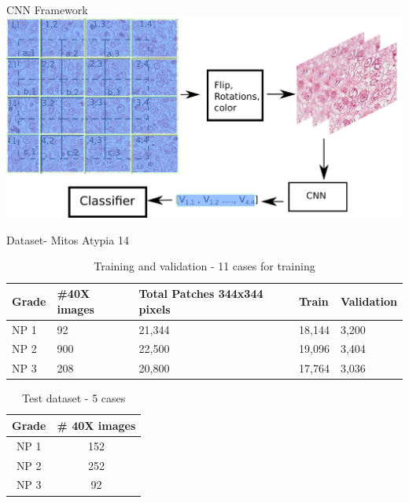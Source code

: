 \documentclass[usenames,dvipsnames]{beamer}
\begin{document}
\begin{frame}{CNN Framework}
    \centering
   \includegraphics[width=1\textwidth]{imagenes_cnn/CCn_methodFS2.png}
\end{frame}




\begin{frame}{Dataset- Mitos Atypia 14}

\begin{table}[]
\begin{tabular}{|m{1cm}|m{2cm}|m{3cm}|m{1.3cm}|m{1.3cm}|}
\hline
\centering
Grade &\centering  \#40X images &\centering Total Patches 344x344 pixels&\centering  Train & Validation \\ \hline
NP 1  & 92            & 21,344  &   18,144   & 3,200          \\ \hline
NP 2  & 900           & 22,500  &  19,096    & 3,404     \\ \hline
NP 3  & 208           & 20,800  &  17,764    & 3,036     \\ \hline
\end{tabular}
\caption{Training and validation - 11 cases for training}
\end{table}
    \begin{table}[]
\begin{tabular}{|c|c|}
\hline
Grade & \# 40X images \\ \hline
NP 1  & 152           \\ \hline
NP 2  & 252           \\ \hline
NP 3  & 92            \\ \hline
\end{tabular}
\caption{Test dataset - 5 cases}
\end{table}
\end{frame}
\end{document}
